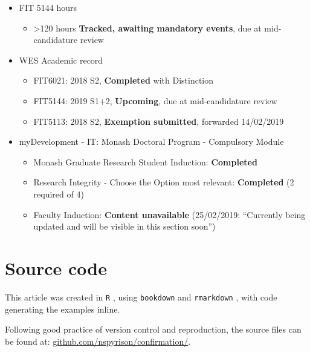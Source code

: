 \documentclass{monashthesis}
\begin{document}
\begin{itemize}
\tightlist
\item
  FIT 5144 hours

  \begin{itemize}
  \tightlist
  \item
    \textgreater{}120 hours \textbf{Tracked, awaiting mandatory events},
    due at mid-candidature review
  \end{itemize}
\item
  WES Academic record

  \begin{itemize}
  \tightlist
  \item
    FIT6021: 2018 S2, \textbf{Completed} with Distinction
  \item
    FIT5144: 2019 S1+2, \textbf{Upcoming}, due at mid-candidature review
  \item
    FIT5113: 2018 S2, \textbf{Exemption submitted}, forwarded 14/02/2019
  \end{itemize}
\item
  myDevelopment - IT: Monash Doctoral Program - Compulsory Module

  \begin{itemize}
  \tightlist
  \item
    Monash Graduate Research Student Induction: \textbf{Completed}
  \item
    Research Integrity - Choose the Option most relevant:
    \textbf{Completed} (2 required of 4)
  \item
    Faculty Induction: \textbf{Content unavailable} (25/02/2019:
    ``Currently being updated and will be visible in this section
    soon'')
  \end{itemize}
\end{itemize}

\chapter{Source code}\label{sec:source}

This article was created in \texttt{R} \autocite{r_core_team_r:_2018},
using \texttt{bookdown} \autocite{xie_bookdown:_2016} and
\texttt{rmarkdown} \autocite{xie_r_2018}, with code generating the
examples inline.

Following good practice of version control and reproduction, the source
files can be found at:
\href{https://github.com/nspyrison/Confirmation}{github.com/nspyrison/confirmation/}.

\appendix
\end{document}
